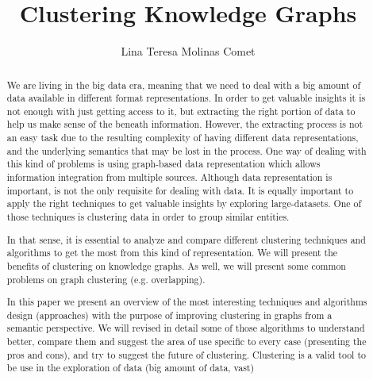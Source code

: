 \documentclass[runningheads]{llncs}
\begin{document}
%
\title{Clustering Knowledge Graphs}
%
%
\author{Lina Teresa Molinas Comet}
%
%
%
\maketitle              %
%
\begin{abstract}
We are living in the big data era, meaning that we need to deal with a big amount of data available in different format representations. In order to get valuable insights it is not enough with just getting access to it, but extracting the right portion of data to help us make sense of the beneath information. However, the extracting process is not an easy task due to the resulting complexity of having different data representations, and the underlying semantics that may be lost in the process. One way of dealing with this kind of problems is using graph-based data representation which allows information integration from multiple sources.
Although data representation is important, is not the only requisite for dealing with data. It is equally important to apply the right techniques to get valuable insights by exploring large-datasets. One of those techniques is clustering data in order to group similar entities.


In that sense, it is essential to analyze and compare different clustering techniques and algorithms to get the most from this kind of representation. We will present the benefits of clustering on knowledge graphs. As well, we will present some common problems on graph clustering (e.g. overlapping).

In this paper we present an overview of the most interesting techniques and algorithms design (approaches) with the purpose of improving clustering in graphs from a semantic perspective. We will revised in detail some of those algorithms to understand better, compare them and suggest the area of use specific to every case (presenting the pros and cons), and try to suggest the future of clustering.
Clustering is a valid tool to be use in the exploration of data (big amount of data, vast)

\end{abstract}
%
%
%
\end{document}
